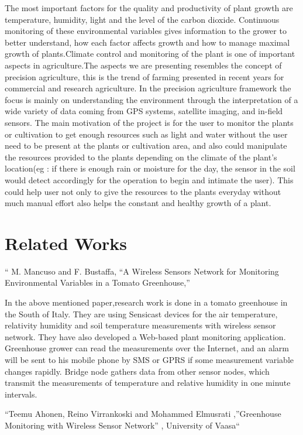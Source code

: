 \documentclass[10pt]{article}
\begin{document}
The most important factors for the quality and productivity of plant growth are temperature, humidity, light and the level of the carbon dioxide. Continuous monitoring of these environmental variables gives information to the grower to better understand, how each factor affects growth and how to manage maximal growth of plants.Climate control and monitoring of the plant is one of important aspects in agriculture.The aspects we are presenting resembles the concept of precision agriculture, this is the trend of farming presented in recent years for commercial and research agriculture. In the precision agriculture framework the focus is mainly on understanding the environment through the interpretation of a wide variety of data coming from GPS systems, satellite imaging, and in-field sensors. The main motivation of the project is for the user to monitor the plants or cultivation to get enough resources such as light and water without the user need to be present at the plants or cultivation area, and also could manipulate the resources provided to the plants depending on the climate of the plant’s location(eg : if there is enough rain or moisture for the day, the sensor in the soil would detect accordingly for the operation to begin and intimate the user). This could help user not only to give the resources to the plants everyday without much manual effort also helps the constant and healthy growth of a plant.


\section*{Related Works}

“ M. Mancuso and F. Bustaffa, “A Wireless Sensors Network for Monitoring Environmental Variables in a Tomato Greenhouse,”


In the above mentioned paper,research work is done in a tomato greenhouse in the South of Italy. They are using Sensicast devices for the air temperature, relativity humidity and soil temperature measurements with wireless sensor network. They have also developed a Web-based plant monitoring application. Greenhouse grower can read the measurements over the Internet, and an alarm will be sent to his mobile phone by SMS or GPRS if some measurement variable changes rapidly. Bridge node gathers data from other sensor nodes, which transmit the measurements of temperature and relative humidity in one minute intervals. 

“Teemu Ahonen, Reino Virrankoski and Mohammed Elmusrati ,”Greenhouse Monitoring with Wireless Sensor Network” , University of Vaasa“
\end{document}
